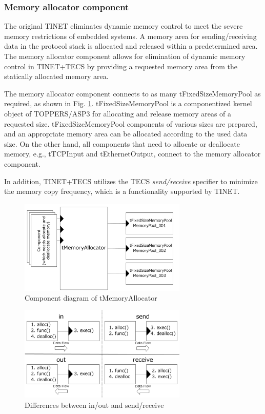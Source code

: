\documentclass[conference]{IEEEtran/IEEEtran}
\begin{document}
\subsubsection{Memory allocator component} 

The original TINET eliminates dynamic memory control to meet the severe memory restrictions of embedded systems.
A memory area for sending/receiving data in the protocol stack is allocated and released within a predetermined area.
The memory allocator component allows for elimination of dynamic memory control in TINET+TECS by providing a requested memory area from the statically allocated memory area.

The memory allocator component connects to as many tFixedSizeMemoryPool as required, as shown in Fig. \ref{fig:tMemoryAllocator}.
tFixedSizeMemoryPool is a componentized kernel object of TOPPERS/ASP3 for allocating and release memory areas of a requested size. 
tFixedSizeMemoryPool components of various sizes are prepared, and an appropriate memory area can be allocated according to the used data size.
On the other hand, all components that need to allocate or deallocate memory, e.g., tTCPInput and tEthernetOutput, connect to the memory allocator component.

In addition, TINET+TECS utilizes the TECS {\it send/receive} specifier to minimize the memory copy frequency, which is a functionality supported by TINET.

\begin{figure}[t]
    \centering
    \includegraphics[width=8.0cm,clip]{figure/tMemoryAllocator.pdf}
    \vspace{-1mm} \caption{Component diagram of tMemoryAllocator}
    \vspace{-1mm} \label{fig:tMemoryAllocator}
\end{figure}

\begin{figure}[t]
    \centering
    \includegraphics[width=8.0cm,clip]{figure/SendReceive.pdf}
    \vspace{-1mm} \caption{Differences between in/out and send/receive}
    \vspace{-1mm} \label{fig:SendReceive}
\end{figure}
\end{document}
